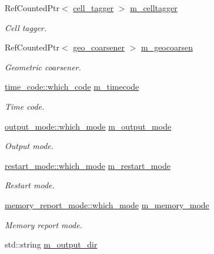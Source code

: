 \begin{DoxyCompactItemize}
Ref\+Counted\+Ptr$<$ \hyperlink{classcell__tagger}{cell\+\_\+tagger} $>$ \hyperlink{classplasma__engine_aa461442fa00ec1752e3947baae8c9762}{m\+\_\+celltagger}
\begin{DoxyCompactList}\small\item\em Cell tagger. \end{DoxyCompactList}\item 
Ref\+Counted\+Ptr$<$ \hyperlink{classgeo__coarsener}{geo\+\_\+coarsener} $>$ \hyperlink{classplasma__engine_a23492fa5ea4b57fe3a9e9ee647fd4814}{m\+\_\+geocoarsen}
\begin{DoxyCompactList}\small\item\em Geometric coarsener. \end{DoxyCompactList}\item 
\hyperlink{namespacetime__code_a92eaf5cbf7ef106eae01fd0d702e36bf}{time\+\_\+code\+::which\+\_\+code} \hyperlink{classplasma__engine_a0dafd26d0f8608c5f17148817a75a004}{m\+\_\+timecode}
\begin{DoxyCompactList}\small\item\em Time code. \end{DoxyCompactList}\item 
\hyperlink{namespaceoutput__mode_ad0fdcb2c9bc1b66e01306939b1bf5cf7}{output\+\_\+mode\+::which\+\_\+mode} \hyperlink{classplasma__engine_aed0bb2dd44f49be95fde9dd8d2952ed6}{m\+\_\+output\+\_\+mode}
\begin{DoxyCompactList}\small\item\em Output mode. \end{DoxyCompactList}\item 
\hyperlink{namespacerestart__mode_aa9c13b092e65386120f08a8862e576ee}{restart\+\_\+mode\+::which\+\_\+mode} \hyperlink{classplasma__engine_a71668180ba2568d17a8bce82321ffcc3}{m\+\_\+restart\+\_\+mode}
\begin{DoxyCompactList}\small\item\em Restart mode. \end{DoxyCompactList}\item 
\hyperlink{namespacememory__report__mode_a7a376e3e2cdf985fc8a6d33aa68c6f44}{memory\+\_\+report\+\_\+mode\+::which\+\_\+mode} \hyperlink{classplasma__engine_aa19df07c387c3eb81c8ed8c00735389c}{m\+\_\+memory\+\_\+mode}
\begin{DoxyCompactList}\small\item\em Memory report mode. \end{DoxyCompactList}\item 
std\+::string \hyperlink{classplasma__engine_ab12f31677d50f5edd0077b0f41dbb6aa}{m\+\_\+output\+\_\+dir}

\end{DoxyCompactItemize}
